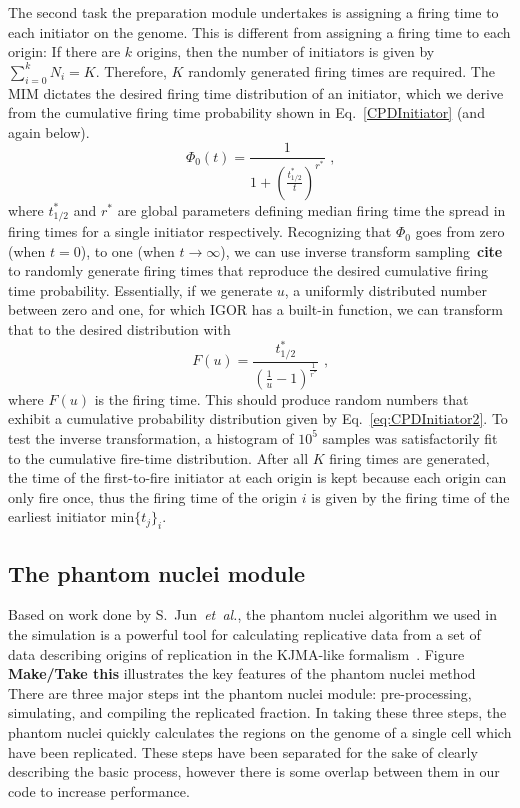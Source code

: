 		The second task the preparation module undertakes is assigning a firing time to each initiator on the genome.
		This is different from assigning a firing time to each origin: If there are $k$ origins, then the number of initiators is given by $\sum\nolimits_{i=0}^k N_i = K$.
		Therefore, $K$ randomly generated firing times are required.
		The MIM dictates the desired firing time distribution of an initiator, which we derive from the cumulative firing time probability shown in Eq.~\ref{CPDInitiator} (and again below).
		\begin{equation} \label{CPDInitiator2}
			\Phi_0(t) = \frac{1}{1+\left(\frac{t^*_{1/2}}{t}\right)^{r^*}}\text{ ,}
		\end{equation}
		where $t^*_{1/2}$ and $r^*$ are global parameters defining median firing time the spread in firing times for a single initiator respectively. 
		Recognizing that $\Phi_0$ goes from zero (when $t=0$), to one (when $t \rightarrow \infty$), we can use inverse transform sampling~\textbf{cite} to randomly generate firing times that reproduce the desired cumulative firing time probability.
		Essentially, if we generate $u$, a uniformly distributed number between zero and one, for which IGOR has a built-in function, we can transform that to the desired distribution with
		\begin{equation}
			F(u) = \frac{t^*_{1/2}}{\left(\frac{1}{u}-1\right)^\frac{1}{r^*}} \text{ ,}
		\end{equation}
		where $F(u)$ is the firing time.
		This should produce random numbers that exhibit a cumulative probability distribution given by Eq.~\ref{eq:CPDInitiator2}.
		To test the inverse transformation, a histogram of $10^5$ samples was satisfactorily fit to the cumulative fire-time distribution.
		After all $K$ firing times are generated, the time of the first-to-fire initiator at each origin is kept because each origin can only fire once, thus the firing time of the origin $i$ is given by the firing time of the earliest initiator $\text{min}\{t_j\}_i$.
		
		
		\subsection{The phantom nuclei module}
		\label{subsec:PhanNuc}
		
		Based on work done by S.~Jun~\emph{et~al.}, the phantom nuclei algorithm we used in the simulation is a powerful tool for calculating replicative data from a set of data describing origins of replication in the KJMA-like formalism~\cite{KJMA1}.
		Figure \textbf{Make/Take this} illustrates the key features of the phantom nuclei method
		There are three major steps int the phantom nuclei module: pre-processing, simulating, and compiling the replicated fraction.
		In taking these three steps, the phantom nuclei quickly calculates the regions on the genome of a single cell which have been replicated.
		These steps have been separated for the sake of clearly describing the basic process, however there is some overlap between them in our code to increase performance.
			
